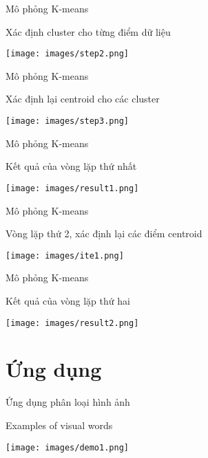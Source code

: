 \documentclass[english,10pt,table]{beamer}
\begin{document}
\begin{frame} {Mô phỏng K-means}
\begin{block}{Xác định cluster cho từng điểm dữ liệu}
	\begin{center}
		\texttt{[image: images/step2.png]}
	\end{center}
\end{block}
\end{frame}

\begin{frame} {Mô phỏng K-means}
\begin{block}{Xác định lại centroid cho các cluster}
	\begin{center}
		\texttt{[image: images/step3.png]}
	\end{center}
\end{block}
\end{frame}

\begin{frame} {Mô phỏng K-means}
\begin{block}{Kết quả của vòng lặp thứ nhất}
	\begin{center}
		\texttt{[image: images/result1.png]}
	\end{center}
\end{block}
\end{frame}

\begin{frame} {Mô phỏng K-means}
\begin{block}{Vòng lặp thứ 2, xác định lại các điểm centroid}
	\begin{center}
		\texttt{[image: images/ite1.png]}
	\end{center}
\end{block}
\end{frame}

\begin{frame} {Mô phỏng K-means}
\begin{block}{Kết quả của vòng lặp thứ hai}
	\begin{center}
		\texttt{[image: images/result2.png]}
	\end{center}
\end{block}
\end{frame}

\section{Ứng dụng}
\begin{frame}{Ứng dụng phân loại hình ảnh}
\begin{block} {Examples of visual words}
	\begin{center}
		\texttt{[image: images/demo1.png]}
	\end{center}
\end{block}
\end{frame}
\end{document}
